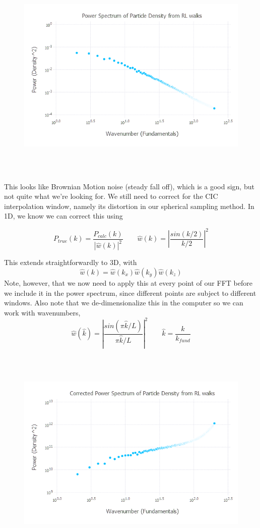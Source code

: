 \documentclass{article}
\begin{document}
\begin{figure}[H]
	\includegraphics[width=6in,height=4in]{"q3ps"}
\end{figure}

This looks like Brownian Motion noise (steady fall off), which is a good sign, but not quite what we're looking for. We still need to correct for the CIC interpolation window, namely its distortion in our spherical sampling method. In 1D, we know we can correct this using

$$P_{true}(k) = \frac{P_{calc}(k)}{|\hat{w}(k)|^2} \qquad \hat{w}(k) = |\frac{sin(k/2)}{k/2}|^2$$

This extends straightforwardly to 3D, with
$$\hat{w}(k) = \hat{w}(k_x)\hat{w}(k_y)\hat{w}(k_z)$$
Note, however, that we now need to apply this at every point of our FFT before we include it in the power spectrum, since different points are subject to different windows. Also note that we de-dimensionalize this in the computer so we can work with wavenumbers,
$$\hat{w}(\hat{k}) = |\frac{sin(\pi\hat{k}/L)}{\pi\hat{k}/L}|^2 \qquad \hat{k} = \frac{k}{k_{fund}}$$

\begin{figure}[H]
	\includegraphics[width=6in,height=4in]{"q3ps_c"}
\end{figure}
\end{document}
